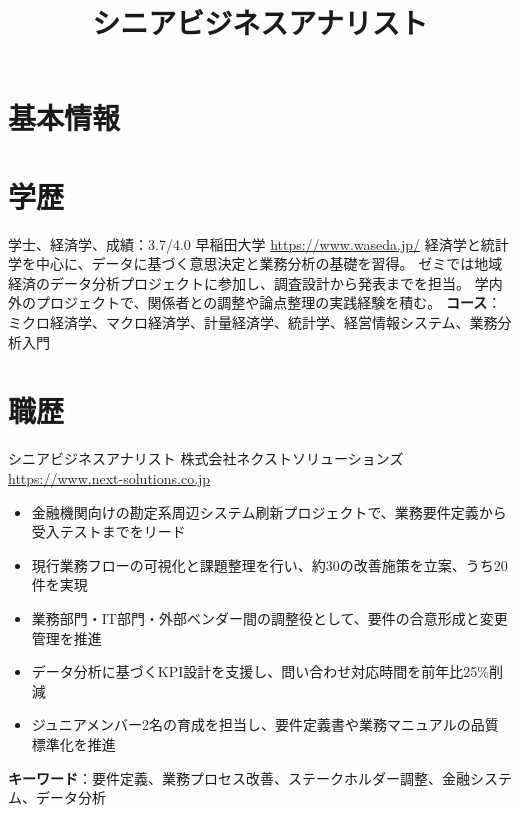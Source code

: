 \documentclass[a4paper, serif, 10pt]{moderncv}
\title{シニアビジネスアナリスト}
\begin{document}
\maketitle

\section{基本情報}

\section{学歴}

        {学士、経済学、成績：3.7/4.0}
        {早稲田大学}
        {\url{https://www.waseda.jp/}}
        {}
        {経済学と統計学を中心に、データに基づく意思決定と業務分析の基礎を習得。
ゼミでは地域経済のデータ分析プロジェクトに参加し、調査設計から発表までを担当。
学内外のプロジェクトで、関係者との調整や論点整理の実践経験を積む。
\textbf{コース}：ミクロ経済学、マクロ経済学、計量経済学、統計学、経営情報システム、業務分析入門}
\section{職歴}

        {シニアビジネスアナリスト}
        {株式会社ネクストソリューションズ}
        {\url{https://www.next-solutions.co.jp}}
        {}
        {\begin{itemize}
\item 金融機関向けの勘定系周辺システム刷新プロジェクトで、業務要件定義から受入テストまでをリード
\item 現行業務フローの可視化と課題整理を行い、約30の改善施策を立案、うち20件を実現
\item 業務部門・IT部門・外部ベンダー間の調整役として、要件の合意形成と変更管理を推進
\item データ分析に基づくKPI設計を支援し、問い合わせ対応時間を前年比25\%削減
\item ジュニアメンバー2名の育成を担当し、要件定義書や業務マニュアルの品質標準化を推進
\end{itemize}
\textbf{キーワード}：要件定義、業務プロセス改善、ステークホルダー調整、金融システム、データ分析}
\end{document}
